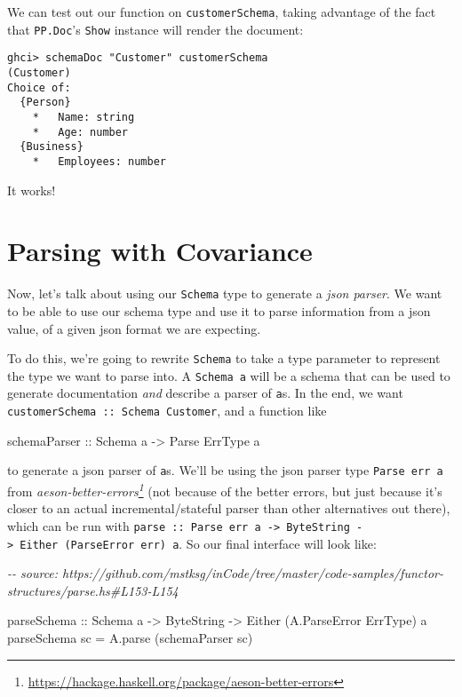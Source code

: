 \documentclass[]{article}
\newenvironment{Shaded}{}{}
\newcommand{\CommentTok}[1]{\textcolor[rgb]{0.38,0.63,0.69}{\textit{#1}}}
\newcommand{\DataTypeTok}[1]{\textcolor[rgb]{0.56,0.13,0.00}{#1}}
\newcommand{\NormalTok}[1]{#1}
\newcommand{\OtherTok}[1]{\textcolor[rgb]{0.00,0.44,0.13}{#1}}
\renewcommand{\href}[2]{#2\footnote{\url{#1}}}
\begin{document}
We can test out our function on \texttt{customerSchema}, taking advantage of the
fact that \texttt{PP.Doc}'s \texttt{Show} instance will render the document:

\begin{verbatim}
ghci> schemaDoc "Customer" customerSchema
(Customer)
Choice of:
  {Person}
    *   Name: string
    *   Age: number
  {Business}
    *   Employees: number
\end{verbatim}

It works!

\hypertarget{parsing-with-covariance}{%
\section{Parsing with Covariance}\label{parsing-with-covariance}}

Now, let's talk about using our \texttt{Schema} type to generate a \emph{json
parser}. We want to be able to use our schema type and use it to parse
information from a json value, of a given json format we are expecting.

To do this, we're going to rewrite \texttt{Schema} to take a type parameter to
represent the type we want to parse into. A \texttt{Schema\ a} will be a schema
that can be used to generate documentation \emph{and} describe a parser of
\texttt{a}s. In the end, we want \texttt{customerSchema\ ::\ Schema\ Customer},
and a function like

\begin{Shaded}
\begin{Highlighting}[]
\OtherTok{schemaParser ::} \DataTypeTok{Schema}\NormalTok{ a }\OtherTok{{-}>} \DataTypeTok{Parse} \DataTypeTok{ErrType}\NormalTok{ a}
\end{Highlighting}
\end{Shaded}

to generate a json parser of \texttt{a}s. We'll be using the json parser type
\texttt{Parse\ err\ a} from
\emph{\href{https://hackage.haskell.org/package/aeson-better-errors}{aeson-better-errors}}
(not because of the better errors, but just because it's closer to an actual
incremental/stateful parser than other alternatives out there), which can be run
with
\texttt{parse\ ::\ Parse\ err\ a\ -\textgreater{}\ ByteString\ -\textgreater{}\ Either\ (ParseError\ err)\ a}.
So our final interface will look like:

\begin{Shaded}
\begin{Highlighting}[]
\CommentTok{{-}{-} source: https://github.com/mstksg/inCode/tree/master/code{-}samples/functor{-}structures/parse.hs\#L153{-}L154}

\OtherTok{parseSchema ::} \DataTypeTok{Schema}\NormalTok{ a }\OtherTok{{-}>} \DataTypeTok{ByteString} \OtherTok{{-}>} \DataTypeTok{Either}\NormalTok{ (}\DataTypeTok{A.ParseError} \DataTypeTok{ErrType}\NormalTok{) a}
\NormalTok{parseSchema sc }\OtherTok{=}\NormalTok{ A.parse (schemaParser sc)}
\end{Highlighting}
\end{Shaded}
\end{document}
